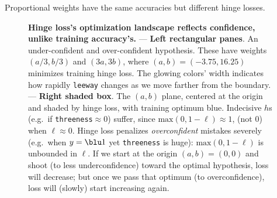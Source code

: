   Proportional weights have the same accuracies but different hinge losses.
  \begin{figure}[h]
    \centering
    \hspace{0.22cm}%
    \hspace{0.22cm}%
    \caption{%
          \textbf{Hinge loss's optimization landscape reflects confidence, unlike
          training accuracy's.}
          --- \textbf{Left rectangular panes}.  An under-confident and
          over-confident hypothesis.  These have weights
          $(a/3, b/3)$ and $(3a, 3b)$, where
          $(a,b)=(-3.75,16.25)$ minimizes training hinge loss.  The glowing
          colors' width indicates how rapidly \texttt{leeway} changes as we
          move farther from the boundary.
          --- \textbf{Right shaded box}.  The $(a,b)$ plane, centered at the
          origin and shaded by hinge loss, with training optimum {\blu blue}.
          Indecisive $h$s (e.g.\ if
          \texttt{threeness}$\approx 0$) suffer, since $\text{max}(0,1-\ell)\approx
          1$, (not $0$) when $\ell\approx 0$.
          Hinge loss penalizes \emph{overconfident} mistakes severely (e.g.\
          when $y={\blu 1}$ yet \texttt{threeness} is huge):
          $\text{max}(0,1-\ell)$ is unbounded in $\ell$.
          If we start at the origin $(a,b)=(0,0)$ and shoot (to less
          underconfidence) toward the optimal hypothesis, loss will
          decrease; but once we pass that optimum (to overconfidence),
          loss will (slowly) start increasing again.
    }
  \end{figure}

